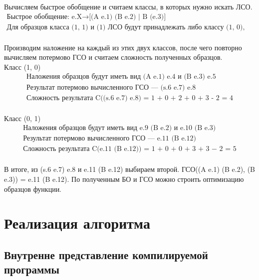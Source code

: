 \documentclass[12pt]{article}
\begin{document}
\indent Вычисляем быстрое обобщение и считаем классы, в которых нужно искать ЛСО.
\begin{equation*}
\begin{array}{l}
\textrm{Быстрое обобщение: e.X}\rightarrow \textrm{[(A e.1) (B e.2) | B (e.3)]} \\
\textrm{Для образцов класса (1, 1) и (1) ЛСО будут принадлежать либо классу (1, 0), либо (0, 1)} \\
\end{array}
\end{equation*} 

\indent Производим наложение на каждый из этих двух классов, после чего повторно вычисляем потермово ГСО и считаем сложность полученных образцов.\\
\indent Класс (1, 0)
\begin{equation*}
\begin{array}{l}
\textrm{Наложения образцов будут иметь вид (A e.1) e.4 и (B e.3) e.5} \\
\textrm{Результат потермово вычисленного ГСО --- (s.6 e.7) e.8} \\
\textrm{Сложность результата C((s.6 e.7) e.8) = 1 + 0 + 2 + 0 + 3 - 2 = 4} \\
\end{array}
\end{equation*} 

\indent Класс (0, 1)
\begin{equation*}
\begin{array}{l}
\textrm{Наложения образцов будут иметь вид e.9 (B e.2) и e.10 (B e.3)} \\
\textrm{Результат потермово вычисленного ГСО --- e.11 (B e.12)} \\
\textrm{Сложность результата C(e.11 (B e.12)) = 1 + 0 + 0 + 3 + 3 − 2 = 5} \\
\end{array}
\end{equation*} 

\indent В итоге, из (s.6 e.7) e.8 и e.11 (B e.12) выбираем второй. ГСО((A e.1) (B e.2), (B e.3)) = e.11 (B e.12). По полученным БО и ГСО можно строить оптимизацию образцов функции.

\newpage

\section[Реализация алгоритма]{\large \centering Реализация алгоритма}
\subsection[Внутренне представление компилируемой программы]{\large Внутренне представление компилируемой программы}
\end{document}
